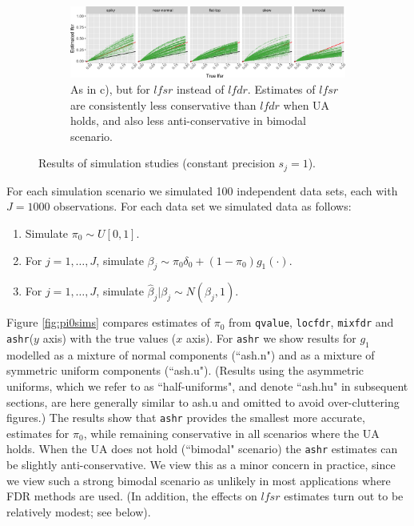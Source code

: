 \documentclass[11pt]{article}
\def\lfdr{\textit{lfdr}}
\def\lfsr{\textit{lfsr}}
\def\bhat{\hat{\beta}}
\def\shat{\hat{s}}
\def\qvalue{{\tt qvalue}\xspace}
\def\locfdr{{\tt locfdr}\xspace}
\def\mixfdr{{\tt mixfdr}\xspace}
\def\ashr{{\tt ashr}\xspace}
\begin{document}
\begin{figure}
\begin{center}
\begin{subfigure}{\textwidth}
\includegraphics[width=\textwidth]{../analysis/figure/plot_lfsr.Rmd/plot_lfsr-1.png} 
\caption{As in c), but for $\lfsr$ instead of $\lfdr$. Estimates of $\lfsr$ are consistently less conservative than $\lfdr$ when UA holds, and also less anti-conservative in bimodal scenario.}  \label{fig:lfsr}
\end{subfigure}
\end{center}
\caption{Results of simulation studies (constant precision $s_j=1$).}
\end{figure}


For each simulation scenario we simulated 100 independent data sets, each with $J=1000$ observations. For each data set we simulated
data as follows:
\begin{enumerate}
\item Simulate $\pi_0  \sim U[0,1]$.
\item For $j=1,\dots,J$, simulate $\beta_j \sim \pi_0 \delta_0 + (1-\pi_0) g_1(\cdot)$.
\item For $j=1,\dots,J$, simulate $\bhat_j | \beta_j \sim N(\beta_j,1)$.
\end{enumerate}

Figure \ref{fig:pi0sims} compares estimates of $\pi_0$ from \qvalue, \locfdr, \mixfdr and \ashr ($y$ axis) with the true values ($x$ axis). 
For \ashr we show results for $g_1$ modelled as a mixture of normal components (``ash.n") 
and as a mixture of symmetric uniform components (``ash.u"). (Results using the asymmetric uniforms, which we refer to
as ``half-uniforms", and denote ``ash.hu" in subsequent sections, are here generally similar to ash.u and omitted to avoid over-cluttering figures.)
The results show that \ashr provides the smallest more accurate, estimates for $\pi_0$, while remaining conservative
in all scenarios where the UA holds. When the UA does not hold (``bimodal" scenario) the \ashr estimates can be slightly anti-conservative.
We view this as a minor concern in practice, since we view such a strong bimodal scenario as unlikely in most applications where FDR methods
are used. (In addition, the effects on $\lfsr$ estimates turn out to be relatively modest; see below). 
\end{document}
